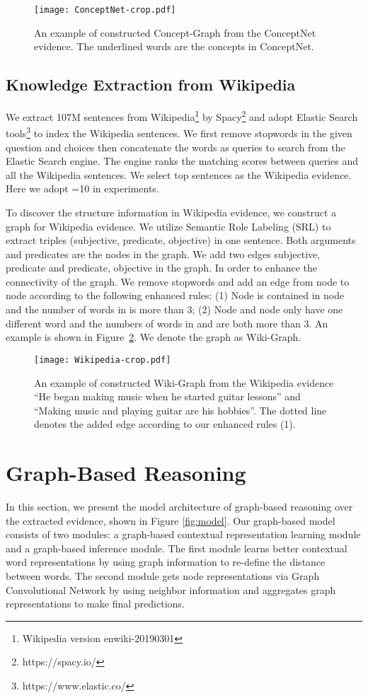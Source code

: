 \documentclass[letterpaper]{article} \usepackage{aaai20}  \usepackage{times}  \usepackage{helvet} \usepackage{courier}  \usepackage[hyphens]{url}  \usepackage{graphicx} \urlstyle{rm} \def\UrlFont{\rm}  \usepackage{graphicx}  \frenchspacing  \setlength{\pdfpagewidth}{8.5in}  \setlength{\pdfpageheight}{11in}
\begin{document}
\begin{figure}[htbp]
	\centering
	\texttt{[image: ConceptNet-crop.pdf]}
	\caption{An example of constructed Concept-Graph from the ConceptNet evidence. The underlined words are the concepts in ConceptNet.}
	\label{fig:concept_graph}
\end{figure}

\subsection{Knowledge Extraction from Wikipedia}
We extract 107M sentences from Wikipedia\footnote{Wikipedia version enwiki-20190301} by Spacy\footnote{https://spacy.io/} and adopt Elastic Search tools\footnote{https://www.elastic.co/} to index the Wikipedia sentences. We first remove stopwords in the given question and choices then concatenate the words as queries to search from the Elastic Search engine. The engine ranks the matching scores between queries and all the Wikipedia sentences. We select top   sentences as the Wikipedia evidence. Here we adopt =10 in experiments.

To discover the structure information in Wikipedia evidence, we construct a graph for Wikipedia evidence. We utilize Semantic Role Labeling (SRL) to extract triples (subjective, predicate, objective) in one sentence. Both arguments and predicates are the nodes in the graph. We add two edges subjective, predicate and predicate, objective in the graph. In order to enhance the  connectivity of the graph. We remove stopwords and add an edge from node  to node  according to the following enhanced rules: (1) Node  is contained in node  and the number of words in  is more than 3;  (2) Node  and node  only have one different word and the numbers of words in  and  are both more than 3. An example is shown in Figure~\ref{fig:wiki_graph}. We denote the  graph as Wiki-Graph.

\begin{figure}[htbp]
	\centering
	\texttt{[image: Wikipedia-crop.pdf]}
	\caption{An example of constructed Wiki-Graph from the Wikipedia evidence ``He began making music when he started guitar lessons'' and ``Making music and playing guitar are his hobbies''. The dotted line denotes the added edge according to our enhanced rules (1).}
	\label{fig:wiki_graph}
\end{figure}


\section{Graph-Based Reasoning}
In this section, we present the model architecture of graph-based reasoning over the extracted evidence, shown in Figure \ref{fig:model}. Our graph-based model consists of two modules: a graph-based contextual representation learning module and a  graph-based inference module. 
The  first  module  learns better contextual word representations by using graph information to re-define the distance between words. The second module gets node representations via Graph Convolutional Network \cite{kipf2016semi} by  using neighbor information and  aggregates graph representations to make final predictions.
\end{document}
